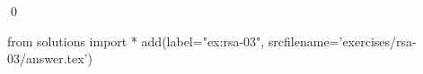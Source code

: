 
\begin{ex} 
  \label{ex:rsa-03}
  
  \qed
\end{ex} 
\begin{python0}
from solutions import *
add(label="ex:rsa-03",
    srcfilename='exercises/rsa-03/answer.tex') 
\end{python0}
